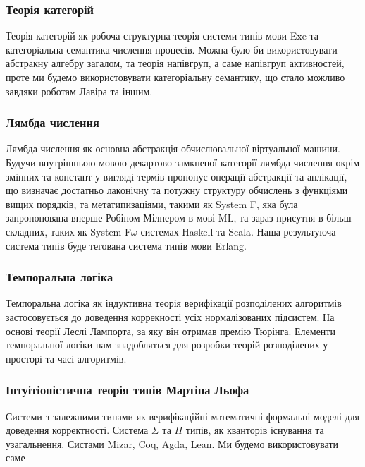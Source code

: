 \documentclass[11pt,oneside]{article}
\begin{document}
\newpage
   \subsubsection*{Теорія категорій}
   Теорія категорій як робоча структурна теорія системи типів мови Exe та
   категоріальна семантика числення процесів. Можна було би використовувати абстракну алгебру загалом,
   та теорія напівгруп, а саме напівгруп активностей, проте ми будемо використовувати
   категоріальну семантику, що стало можливо завдяки роботам Лавіра та іншим.\\

   \subsubsection*{Лямбда числення}
   Лямбда-числення як основна абстракція обчислювальної віртуальної машини.
   Будучи внутрішньою мовою декартово-замкненої категорії лямбда числення окрім змінних
   та констант у вигляді термів пропонує операції абстракції та аплікації, що визначає
   достатньо лаконічну та потужну структуру обчислень з функціями вищих порядків,
   та метатипизаціями, такими як System F, яка була запропонована
   вперше Робіном Мілнером в мові ML, та зараз присутня в більш складних,
   таких як System F$\omega$ системах Haskell та Scala. Наша результуюча система
   типів буде тегована система типів мови Erlang.

   \subsubsection*{Темпоральна логіка}
   Темпоральна логіка як індуктивна теорія верифікації розподілених алгоритмів
   застосовується до доведення коррекності усіх нормалізованих підсистем. На основі
   теорії  Леслі Лампорта\cite{tla}, за яку він отримав премію Тюрінга.
   Елементи темпоральної логіки нам знадобляться для розробки теорій
   розподілених у просторі та часі алгоритмів.\\

   \subsubsection*{Інтуітіоністична теорія типів Мартіна Льофа}
   Системи з залежними типами як верифікаційні математичні формальні моделі
   для доведення корректності. Система $\Sigma$ та $\Pi$ типів, як кванторів
   існування та узагальнення. Систами Mizar, Coq, Agda, Lean. Ми будемо
   використовувати саме
\end{document}

